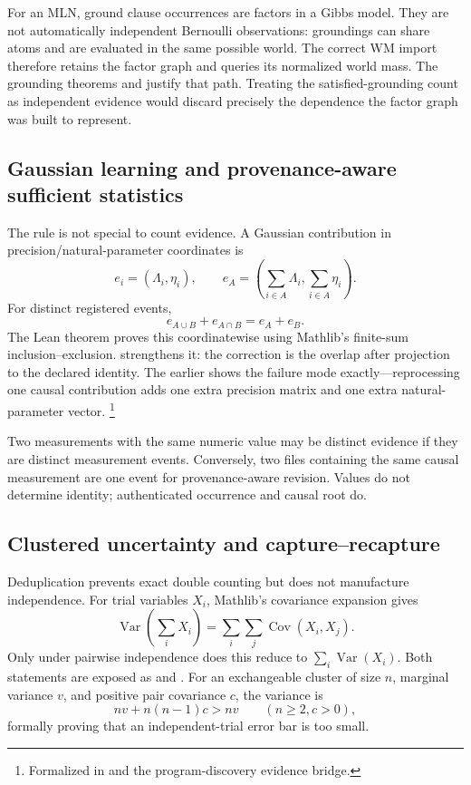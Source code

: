 \documentclass[11pt,openany]{report}
\begin{document}
For an MLN, ground clause occurrences are factors in a Gibbs model.  They are
not automatically independent Bernoulli observations: groundings can share
atoms and are evaluated in the same possible world.  The correct WM import
therefore retains the factor graph and queries its normalized world mass.
The grounding theorems
 and
 justify that path.  Treating
the satisfied-grounding count as independent evidence would discard precisely
the dependence the factor graph was built to represent.

\subsection{Gaussian learning and provenance-aware sufficient statistics}

The rule is not special to count evidence.  A Gaussian contribution in
precision/natural-parameter coordinates is
\[
  e_i=(\Lambda_i,\eta_i),\qquad
  e_A=\left(\sum_{i\in A}\Lambda_i,
             \sum_{i\in A}\eta_i\right).
\]
For distinct registered events,
\[
  e_{A\cup B}+e_{A\cap B}=e_A+e_B.
\]
The Lean theorem
 proves this
coordinatewise using Mathlib's finite-sum inclusion--exclusion.
 strengthens it:
the correction is the overlap after projection to the declared identity.
The earlier
 shows the failure
mode exactly---reprocessing one causal contribution adds one extra precision
matrix and one extra natural-parameter vector.%
\footnote{Formalized in
and the program-discovery evidence bridge.}

Two measurements with the same numeric value may be distinct evidence if
they are distinct measurement events.  Conversely, two files containing the
same causal measurement are one event for provenance-aware revision.  Values
do not determine identity; authenticated occurrence and causal root do.

\subsection{Clustered uncertainty and capture--recapture}

Deduplication prevents exact double counting but does not manufacture
independence.  For trial variables $X_i$, Mathlib's covariance expansion gives
\[
  \operatorname{Var}\!\left(\sum_i X_i\right)
    =\sum_i\sum_j\operatorname{Cov}(X_i,X_j).
\]
Only under pairwise independence does this reduce to
$\sum_i\operatorname{Var}(X_i)$.  Both statements are exposed as
 and
.
For an exchangeable cluster of size $n$, marginal variance $v$, and positive
pair covariance $c$, the variance is
\[
  nv+n(n-1)c>nv\qquad(n\ge2,c>0),
\]
formally proving that an independent-trial error bar is too small.
\end{document}
